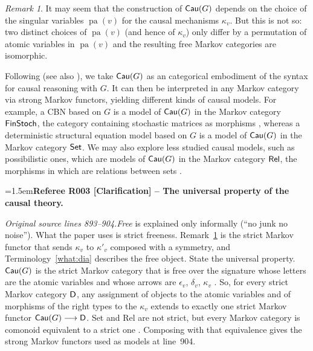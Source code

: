 \documentclass[12pt]{amsart}
\newcommand{\RefereeRemark}[4]{%
  \par\medskip\begingroup\normalfont\small\color{RefereePurple}%
  \emergencystretch=1.5em\noindent\textbf{Referee R#1 [#2] -- #3.}\par\nobreak\noindent #4\par
  \endgroup\medskip
}
\theoremstyle{plain}
\theoremstyle{definition}
\theoremstyle{remark}
\newtheorem{rem}[thm]{Remark}
\numberwithin{equation}{section}
\theoremstyle{plain}
\newcommand{\0}{\emptyset}
\newcommand{\fun}{\longrightarrow}
\newcommand{\cat}[1]{\textup{\textsf{#1}}}
\DeclareMathOperator{\cau}{\sf{Cau}}
\DeclareMathOperator{\pa}{pa}
\begin{document}
\begin{rem}\label{cau:mech:ind}
It may seem that the construction of $\cat{Cau}(G)$ depends on the choice of the singular variables $\pa(v)$ for the causal mechanisms $\kappa_v$. But this is not so: two distinct choices of $\pa(v)$ (and hence of $\kappa_v$) only differ by a permutation of atomic variables in $\pa(v)$ and the resulting  free  Markov categories are isomorphic.
\end{rem}

Following \cite{Fong:thesis} (see also \cite{jacobs2019causal}), we take $\cau(G)$ as an categorical embodiment of the syntax for causal reasoning with $G$. It can then be interpreted in any Markov category via strong Markov functors, yielding different kinds of causal models. For example, a CBN based on $G$ is a model of $\cat{Cau}(G)$ in the Markov category $\cat{FinStoch}$, the category containing stochastic matrices as morphisms \cite{ Fong:thesis, fritz2020synthetic, jacobs2019causal}, whereas a deterministic structural equation model based on $G$ is a model of $\cat{Cau}(G)$ in the Markov category $\cat{Set}$. We may also explore less studied causal models, such as possibilistic ones, which are models of $\cat{Cau}(G)$ in the Markov category $\cat{Rel}$, the morphisms in which are relations between sets \cite{Fong:thesis}.
\hypertarget{review-003}{}\RefereeRemark{003}{Clarification}{The universal property of the causal theory}{%
\textit{Original source lines 893--904.}\quad \emph{Free} is explained only informally (``no junk no noise''). What the paper uses is strict freeness. Remark~\ref{cau:mech:ind} is the strict Markov functor that sends $\kappa_v$ to $\kappa'_v$ composed with a symmetry, and Terminology~\ref{what:dia} describes the free object. State the universal property. $\cau(G)$ is the strict Markov category that is free over the signature whose letters are the atomic variables and whose arrows are $\epsilon_v$, $\delta_v$, $\kappa_v$ \cite[Theorem~4.1, Definition~6.2]{YinZhangModularity}. So, for every strict Markov category $\cat D$, any assignment of objects to the atomic variables and of morphisms of the right types to the $\kappa_v$ extends to exactly one strict Markov functor $\cau(G) \fun \cat D$. \cat{Set} and \cat{Rel} are not strict, but every Markov category is comonoid equivalent to a strict one \cite[Theorem~10.17]{fritz2020synthetic}. Composing with that equivalence gives the strong Markov functors used as models at line~904.
}
\end{document}
